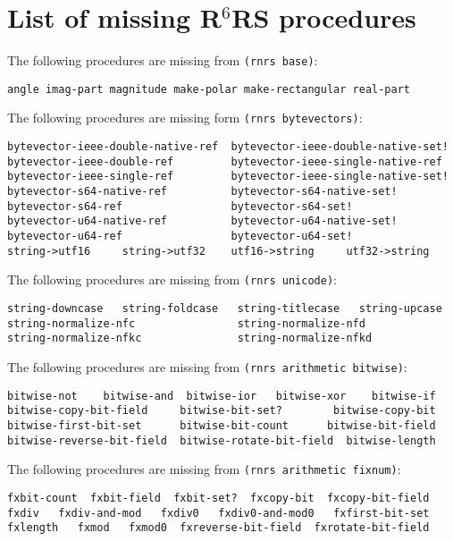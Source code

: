 \documentclass[onecolumn, 12pt, twoside, openright, dvipdfm]{book}
\newcommand{\rnrs}[1]{R$^{\mathrm{#1}}$RS}
\begin{document}
\section{List of missing \rnrs{6} procedures}

The following procedures are missing from \texttt{(rnrs base)}:
\begin{Verbatim}
angle imag-part magnitude make-polar make-rectangular real-part
\end{Verbatim}

The following procedures are missing form \texttt{(rnrs bytevectors)}:
\begin{Verbatim}
bytevector-ieee-double-native-ref  bytevector-ieee-double-native-set! 
bytevector-ieee-double-ref         bytevector-ieee-single-native-ref    
bytevector-ieee-single-ref         bytevector-ieee-single-native-set! 
bytevector-s64-native-ref          bytevector-s64-native-set!    
bytevector-s64-ref                 bytevector-s64-set!    
bytevector-u64-native-ref          bytevector-u64-native-set!    
bytevector-u64-ref                 bytevector-u64-set! 
string->utf16     string->utf32    utf16->string     utf32->string
\end{Verbatim}


The following procedures are missing from \texttt{(rnrs unicode)}:
\begin{Verbatim}
string-downcase   string-foldcase   string-titlecase   string-upcase    
string-normalize-nfc                string-normalize-nfd 
string-normalize-nfkc               string-normalize-nfkd   
\end{Verbatim}


The following procedures are missing from \texttt{(rnrs arithmetic
bitwise)}:
\begin{Verbatim}
bitwise-not    bitwise-and  bitwise-ior   bitwise-xor    bitwise-if 
bitwise-copy-bit-field     bitwise-bit-set?        bitwise-copy-bit 
bitwise-first-bit-set      bitwise-bit-count      bitwise-bit-field 
bitwise-reverse-bit-field  bitwise-rotate-bit-field  bitwise-length  
\end{Verbatim}


The following procedures are missing from \texttt{(rnrs arithmetic
fixnum)}:
\begin{Verbatim}
fxbit-count  fxbit-field  fxbit-set?  fxcopy-bit  fxcopy-bit-field
fxdiv   fxdiv-and-mod   fxdiv0   fxdiv0-and-mod0   fxfirst-bit-set 
fxlength   fxmod   fxmod0  fxreverse-bit-field  fxrotate-bit-field   
\end{Verbatim}
\end{document}

